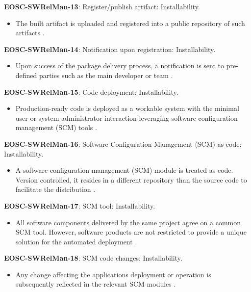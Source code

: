 \textbf{EOSC-SWRelMan-13}: Register/publish artifact: Installability.

\begin{itemize}
    \item The built artifact is uploaded and registered into a public repository of such artifacts \cite{orviz_set_2017}.
\end{itemize}

\textbf{EOSC-SWRelMan-14}: Notification upon registration: Installability.

\begin{itemize}
    \item Upon success of the package delivery process, a notification is sent to pre-defined parties such as the main developer or team \cite{orviz_set_2017}.
\end{itemize}

\textbf{EOSC-SWRelMan-15}: Code deployment: Installability.

\begin{itemize}
    \item Production-ready code is deployed as a workable system with the minimal user or system administrator interaction leveraging software configuration management (SCM) tools \cite{orviz_set_2017}.
\end{itemize}

\textbf{EOSC-SWRelMan-16}: Software Configuration Management (SCM) as code: Installability.

\begin{itemize}
    \item A software configuration management (SCM) module is treated as code. Version controlled, it resides in a different repository than the source code to facilitate the distribution \cite{orviz_set_2017}.
\end{itemize}

\textbf{EOSC-SWRelMan-17}: SCM tool: Installability.

\begin{itemize}
    \item All software components delivered by the same project agree on a common SCM tool. However, software products are not restricted to provide a unique solution for the automated deployment \cite{orviz_set_2017}.
\end{itemize}

\textbf{EOSC-SWRelMan-18}: SCM code changes: Installability.

\begin{itemize}
    \item Any change affecting the applications deployment or operation is subsequently reflected in the relevant SCM modules \cite{orviz_set_2017}.
\end{itemize}

